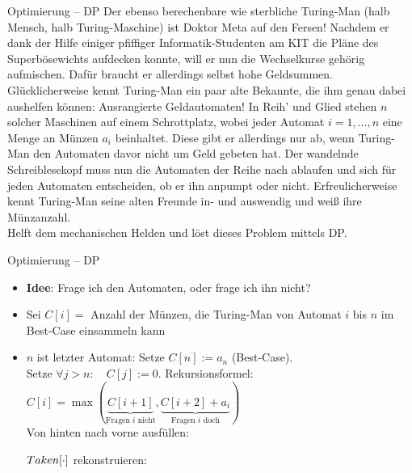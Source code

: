 \begin{frame}{Optimierung – DP}
	\vspace{-.3\baselineskip}
	Der ebenso berechenbare wie sterbliche Turing-Man {\small (halb Mensch, halb Turing-Maschine)} ist Doktor Meta auf den Fersen! Nachdem er dank der Hilfe einiger pfiffiger Informatik-Studenten am KIT die Pläne des Superbösewichts aufdecken konnte, will er nun die Wechselkurse gehörig aufmischen. Dafür braucht er allerdings selbst hohe Geldsummen. Glücklicherweise kennt Turing-Man ein paar alte Bekannte, die ihm genau dabei aushelfen können: Ausrangierte Geldautomaten! In Reih' und Glied stehen $n$ solcher Maschinen auf einem Schrottplatz, wobei jeder Automat $i = 1,...,n$ eine Menge an Münzen $a_i$ beinhaltet. Diese gibt er allerdings nur ab, wenn Turing-Man den Automaten davor nicht um Geld gebeten hat. 
	Der wandelnde Schreiblesekopf muss nun die Automaten der Reihe nach ablaufen und sich für jeden Automaten entscheiden, ob er ihn anpumpt oder nicht. Erfreulicherweise kennt Turing-Man seine alten Freunde in- und auswendig und weiß ihre Münzanzahl. \\
	Helft dem mechanischen Helden und löst dieses Problem mittels DP.
\end{frame}

\begin{frame}{Optimierung – DP}
	\solutionheading
	\begin{itemize}
		\item \textbf{Idee}: Frage ich den Automaten, oder frage ich ihn nicht?
		\item Sei $C[i] = $ Anzahl der Münzen, die Turing-Man von Automat $i$ bis $n$ im Best-Case einsammeln kann \\
		\pause
		\item $n$ ist letzter Automat: Setze $C[n] := a_n$ \: (Best-Case). \\ 
		Setze $\forall j > n: \quad C[j] := 0$.
		\implitem Rekursionsformel: \\
			$C[i] = \max(\underbrace{C[i+1]}_{\text{Fragen $i$ nicht}}, \underbrace{C[i+2] + a_i}_{\text{Fragen $i$ doch}})$\\
		\pause
		\implitem Von hinten nach vorne ausfüllen: 
		\begin{algorithm}[H]
		\end{algorithm} \vspace{-.2\baselineskip}
		$Taken[\cdot]$ rekonstruieren: \vspace{-.2\baselineskip} \\
		\begin{algorithm}[H]
		\end{algorithm}
	\end{itemize}
\end{frame}

